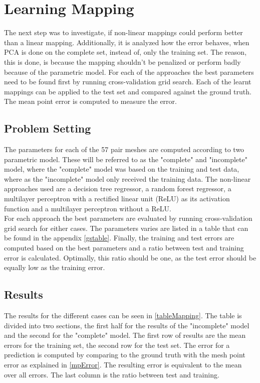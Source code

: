 \section{Learning Mapping}
The next step was to investigate, if non-linear mappings could perform better than a linear mapping. Additionally, it is analyzed how the error behaves, when PCA is done on the complete set, instead of, only the training set. The reason, this is done, is because the mapping shouldn't be penalized or perform badly because of the parametric model. For each of the approaches the best parameters need to be found first by running cross-validation grid search. Each of the learnt mappings can be applied to the test set and compared against the ground truth. The mean point error is computed to measure the error.

\subsection{Problem Setting}
The parameters for each of the 57 pair meshes are computed according to two parametric model. These will be referred to as the "complete" and "incomplete" model, where the "complete" model was based on the training and test data, where as the "incomplete" model only received the training data. The non-linear approaches used are a decision tree regressor, a random forest regressor, a multilayer perceptron with a rectified linear unit (ReLU) as its activation function and a multilayer perceptron without a ReLU. \\
For each approach the best parameters are evaluated by running cross-validation grid search for either cases. The parameters varies are listed in a table that can be found in the appendix \ref{gstable}.
Finally, the training and test errors are computed based on the best parameters and a ratio between test and training error is calculated. Optimally, this ratio should be one, as the test error should be equally low as the training error.

\subsection{Results}
The results for the different cases can be seen in \ref{tableMapping}. The table is divided into two sections, the first half for the results of the "incomplete" model and the second for the "complete" model. The first row of results are the mean errors for the training set, the second row for the test set. The error for a prediction is computed by comparing to the ground truth with the mesh point error as explained in \ref{mpError}. The resulting error is equivalent to the mean over all errors. The last column is the ratio between test and training.


